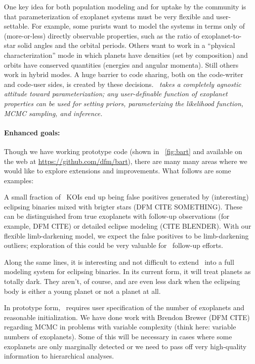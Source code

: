 \documentclass[letterpaper,12pt,preprint]{hack_aastex}
\newcommand{\Bart}{\package{Bart}}
\begin{document}
One key idea for both population modeling and for uptake by the
community is that parameterization of exoplanet systems must be very
flexible and user-settable.  For example, some purists want to model
the systems in terms only of (more-or-less) directly observable
properties, such as the ratio of exoplanet-to-star solid angles and
the orbital periods.  Others want to work in a ``physical
characterization'' mode in which planets have densities (set by
composition) and orbits have conserved quantities (energies and
angular momenta).  Still others work in hybrid modes.  A huge barrier
to code sharing, both on the code-writer and code-user sides, is
created by these decisions.  \emph{\Bart\ takes a completely agnostic
attitude toward parameterization; any user-definable function of
exoplanet properties can be used for setting priors, parameterizing
the likelihood function, MCMC sampling, and inference.}

\paragraph{Enhanced goals:}
Though we have working prototype code (shown in
\figurename~\ref{fig:bart} and available on the web at
\url{https://github.com/dfm/bart}), there are many many areas where we
would like to explore extensions and improvements.  What follows are
some examples:

A small fraction of \Kepler\ KOIs end up being false positives
generated by (interesting) eclipsing binaries mixed with brigter stars
(DFM CITE SOMETHING).  These can be distinguished from true exoplanets
with follow-up observations (for example, DFM CITE) or detailed
eclipse modeling (CITE BLENDER).  With our flexible limb-darkening
model, we expect the false positives to be limb-darkening outliers;
exploration of this could be very valuable for \Kepler\ follow-up
efforts.

Along the same lines, it is interesting and not difficult to extend
\Bart\ into a full modeling system for eclipsing binaries.  In its
current form, it will treat planets as totally dark.  They aren't, of
course, and are even less dark when the eclipsing body is either a
young planet or not a planet at all.

In prototype form, \Bart\ requires user specification of the number of
exoplanets and reasonable initialization.  We have done work with
Brendon Brewer (DFM CITE) regarding MCMC in problems with variable
complexity (think here: variable numbers of exoplanets).  Some of this
will be necessary in cases where some exoplanets are only marginally
detected or we need to pass off very high-quality information to
hierarchical analyses.
\end{document}
